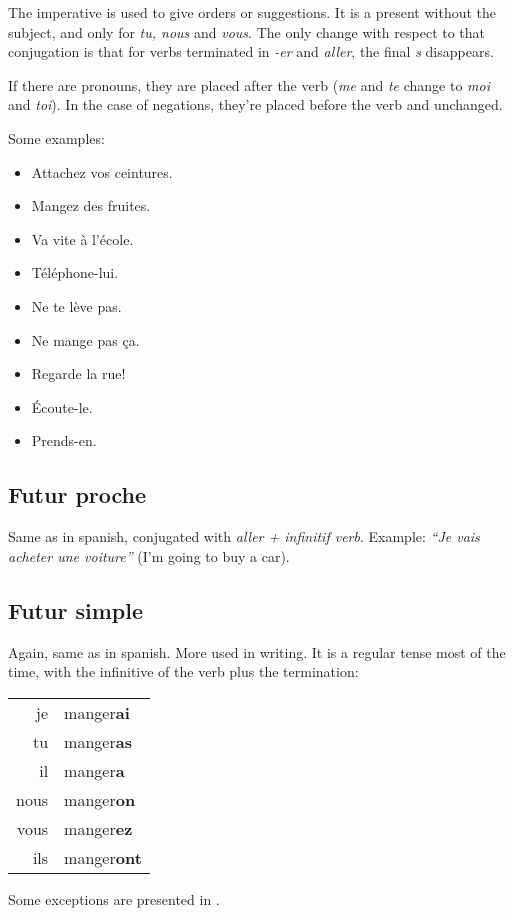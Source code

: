 \documentclass{epflnotes}
\newcommand{\conjug}[6]{\begin{tabular}{rl}
je & #1 \\
tu & #2 \\
il & #3 \\
nous & #4 \\
vous & #5 \\
ils & #6 \\
\end{tabular}}
\begin{document}
The imperative is used to give orders or suggestions. It is a present without the subject, and only for \textit{tu, nous} and \textit{vous}. The only change with respect to that conjugation is that for verbs terminated in \textit{-er} and \textit{aller}, the final \textit{s} disappears.

If there are pronouns, they are placed after the verb (\textit{me} and \textit{te} change to \textit{moi} and \textit{toi}). In the case of negations, they're placed before the verb and unchanged.

Some examples:

\begin{multicols}{3}
\begin{itemize}
\item Attachez vos ceintures.
\item Mangez des fruites.
\item Va vite à l'école.
\item Téléphone-lui.
\item Ne te lève pas.
\item Ne mange pas ça.
\item Regarde la rue!
\item Écoute-le.
\item Prends-en.
\end{itemize}
\end{multicols}

\subsection{Futur proche}

Same as in spanish, conjugated with \textit{aller + infinitif verb}. Example: \textit{``Je vais acheter une voiture''} (I'm going to buy a car).

\subsection{Futur simple}

Again, same as in spanish. More used in writing. It is a regular tense most of the time, with the infinitive of the verb plus the termination:

\begin{center}
\conjug
	{manger\textbf{ai}}
	{manger\textbf{as}}
	{manger\textbf{a}}
	{manger\textbf{on}}
	{manger\textbf{ez}}
	{manger\textbf{ont}}
\end{center}

Some exceptions are presented in .
\end{document}
